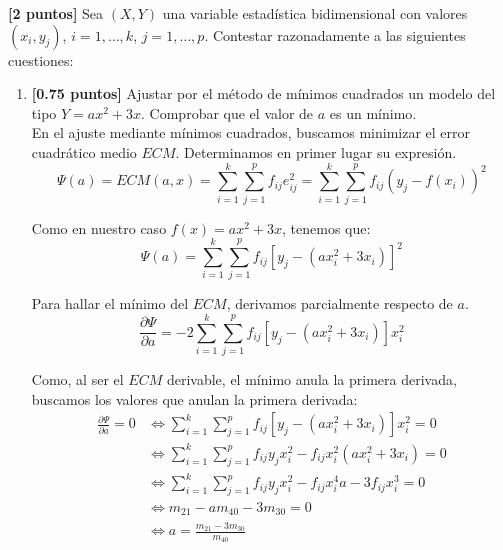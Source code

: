 \documentclass[12pt]{article}
\begin{document}
    \begin{ejercicio}\textbf{[2 puntos]} Sea $(X,Y)$ una variable estadística bidimensional con valores $(x_i,y_j)$, $i=1,\dots, k$, $j=1,\dots,p$. Contestar razonadamente a las siguientes cuestiones:
\begin{enumerate}
    \item \textbf{[0.75 puntos]} Ajustar por el método de mínimos cuadrados un modelo del tipo $Y=ax^2+3x$. Comprobar que el valor de $a$ es un mínimo.\\

    En el ajuste mediante mínimos cuadrados, buscamos minimizar el error cuadrático medio $ECM$. Determinamos en primer lugar su expresión.
    \begin{equation*}
        \Psi(a) = ECM(a,x)
        =\sum_{i=1}^k \sum_{j=1}^p f_{ij}e_{ij}^2
        =\sum_{i=1}^k \sum_{j=1}^p f_{ij}(y_j-f(x_i))^2
    \end{equation*}

    Como en nuestro caso $f(x)=ax^2+3x$, tenemos que:
    \begin{equation*}
        \Psi(a)
        =\sum_{i=1}^k \sum_{j=1}^p f_{ij}[y_j-(ax_i^2+3x_i)]^2
    \end{equation*}

    Para hallar el mínimo del $ECM$, derivamos parcialmente respecto de $a$.
    \begin{equation*}
        \frac{\partial \Psi}{\partial a} = -2\sum_{i=1}^k \sum_{j=1}^p f_{ij}[y_j-(ax_i^2+3x_i)]x_i^2
    \end{equation*}

    Como, al ser el $ECM$ derivable, el mínimo anula la primera derivada, buscamos los valores que anulan la primera derivada:
    \begin{equation*}\begin{split}
        \frac{\partial \Psi}{\partial a} = 0&
        \Longleftrightarrow
        \sum_{i=1}^k \sum_{j=1}^p f_{ij}[y_j-(ax_i^2+3x_i)]x_i^2 = 0
        \\ & \Longleftrightarrow
        \sum_{i=1}^k \sum_{j=1}^p f_{ij}y_jx_i^2 -f_{ij}x_i^2(ax_i^2+3x_i) = 0
        \\ & \Longleftrightarrow
        \sum_{i=1}^k \sum_{j=1}^p f_{ij}y_jx_i^2 -f_{ij}x_i^4a-3f_{ij}x_i^3 = 0
        \\ & \Longleftrightarrow
        m_{21}-am_{40} -3m_{30}=0
        \\ & \Longleftrightarrow
        a=\frac{m_{21}-3m_{30}}{m_{40}}
    \end{split}\end{equation*}
    

\end{enumerate}
\end{ejercicio}
\end{document}
